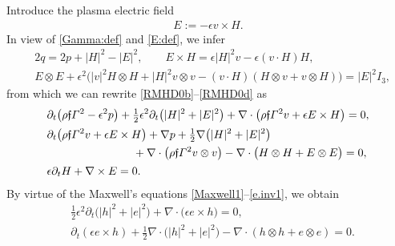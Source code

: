 \documentclass[twoside,11pt]{article}
\numberwithin{equation}{section}
\def\p{\partial}
\begin{document}
Introduce the plasma electric field
	\begin{align} \label{E:def}
		E:=-\epsilon v\times H.
	\end{align}
	In view of \eqref{Gamma:def} and \eqref{E:def}, we infer
	\begin{align}
		\nonumber
		&2q=2p+|H|^2-|E|^2,\qquad
		E\times H=\epsilon |H|^2v-\epsilon (v\cdot H)H,\\
		\nonumber &
		E\otimes E+\epsilon^2\big(|v|^2H\otimes H + |H|^2 v\otimes v  -(v\cdot H)(H\otimes v+v\otimes H)\big)=|E|^2I_3,
	\end{align}
	from which we can rewrite \eqref{RMHD0b}--\eqref{RMHD0d} as
	\begin{align}\label{RMHD2b}
		&\p_t\big(\rho \mathfrak{f} \varGamma^2-\epsilon^2p\big)+\tfrac{1}{2}\epsilon^2\p_t\big(|H|^2+|E|^2\big)
		+\nabla \cdot \big( \rho \mathfrak{f} \varGamma^2 v+\epsilon E\times H \big)=0,\\[0.5mm]
		\nonumber		&\p_t\big( \rho \mathfrak{f} \varGamma^2 v+\epsilon E\times H \big)
		+\nabla p+\tfrac{1}{2}\nabla\big(|H|^2+ |E|^2\big)
		\\
		&\hspace*{7.7em}\label{RMHD2c}
		+\nabla\cdot \big( \rho \mathfrak{f} \varGamma^2 v\otimes v\big)-
		\nabla\cdot \big( H\otimes H+E\otimes E \big)=0,\\[0.5mm]
		&\epsilon\p_t H+\nabla\times E=0.\label{RMHD2d}
	\end{align}
	By virtue of the Maxwell's equations \eqref{Maxwell1}--\eqref{e.inv1}, we obtain
	\begin{align} \label{Max2}
		&	\tfrac{1}{2}\epsilon^2\p_t\big(|h|^2+|e|^2\big)+\nabla\cdot \big(\epsilon e\times h\big)=0,\\[1mm]
		\label{Max3}
		& 	 \p_t(\epsilon  e\times h)+\tfrac{1}{2}\nabla\cdot\big(|h|^2+|e|^2\big)-\nabla\cdot (h\otimes h+e\otimes e)=0.
	\end{align}	
\end{document}
